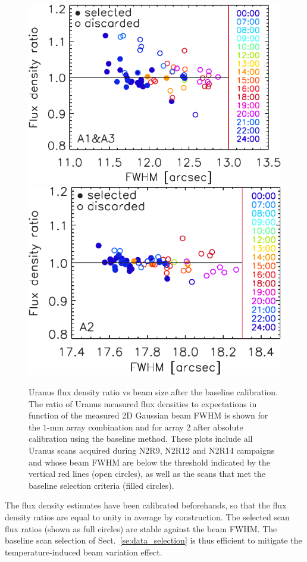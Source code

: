 \begin{figure}[!htbp]
\begin{center}
\includegraphics[clip=true, trim={0, -0.3cm, -0.3cm, 0}, width=0.525\linewidth]{Figures/plot_flux_density_ratio_fwhm_uranus_corrected_skydip_narrow_1mm.pdf}
\includegraphics[clip=true, trim={0.7cm, -0.3cm, -0.25cm, 0}, width=0.465\linewidth]{Figures/plot_flux_density_ratio_fwhm_uranus_corrected_skydip_narrow_a2.pdf}
\caption[Uranus flux density stability against FWHM]{ Uranus flux
density ratio vs beam size after the baseline calibration. The ratio
of Uranus measured flux densities to expectations in function of the
measured 2D Gaussian beam FWHM is shown for the $1$-mm array
combination and for array 2 after absolute calibration using the
baseline method. These plots include all Uranus scans acquired during
N2R9, N2R12 and N2R14 campaigns and whose beam FWHM are below the threshold indicated
by the vertical red lines (open circles), as well as the scans that
met the baseline selection criteria (filled circles).}
\label{fig:calib_uranus_vs_fwhm_all}
\end{center}
\end{figure}

The flux density estimates have been calibrated beforehands, so that
the flux density ratios are equal to unity in average by construction.
The selected scan flux ratios (shown as full circles) are stable
against the beam FWHM. The baseline scan selection of
Sect.~\ref{se:data_selection} is thus efficient to mitigate the
temperature-induced beam variation effect.


